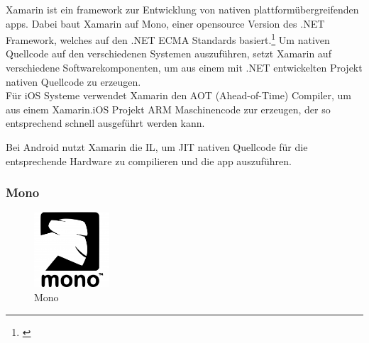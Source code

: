 Xamarin ist ein \gls{framework} zur Entwicklung von nativen plattformübergreifenden \glspl{app}. Dabei baut Xamarin auf Mono, einer opensource Version des .NET Framework, welches auf den .NET ECMA Standards basiert.\footnote{\citep[vgl.][Introduction to Mobile Development - Xamarin]{Xamarin.Introductionto}\label{note3}} Um nativen Quellcode auf den verschiedenen Systemen auszuführen, setzt Xamarin auf verschiedene Softwarekomponenten, um aus einem mit .NET entwickelten Projekt nativen Quellcode zu erzeugen.\\
Für iOS Systeme verwendet Xamarin den AOT (Ahead-of-Time) Compiler, um aus einem Xamarin.iOS Projekt ARM Maschinencode zur erzeugen, der so entsprechend schnell ausgeführt werden kann.
 
 Bei Android nutzt Xamarin die IL, um JIT nativen Quellcode für die entsprechende Hardware zu compilieren und die \gls{app} auszuführen.

\subsubsection{Mono}

\begin{figure}
	\begin{center}
		\includegraphics[width=0.25\textwidth]{images/technische_grundlagen/mono.png}
	\end{center}
	\caption{Mono}
	\label{fig:mono}
\end{figure}


